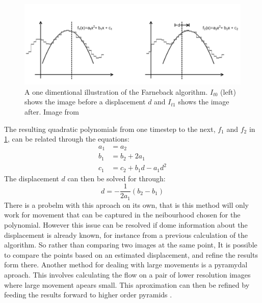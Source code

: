 \documentclass{UoNMCHA}
\numberwithin{equation}{section}
\begin{document}
\begin{figure}[ht]\label{fig:farnebackAlgorithm}
    \begin{center}
        \includegraphics[width=1\linewidth]{Figures/farnebackAccuracy}
        \caption{A one dimentional illustration of the Farneback algorithm. $I_{t0}$ (left) shows the image before a displacement $d$ and $I_{t1}$ shows the image after. Image from \citep{learningOpenCV}}
    \end{center}
\end{figure}
The resulting quadratic polynomials from one timestep to the next, $f_{1}$ and $f_{2}$ in \cref{fig:farnebackAlgorithm}, can be related through the equations:
\begin{equation}
	\begin{split}
		a_{1} &= a_{2}\\
		b_{1} &= b_{2} + 2a_{1}\\
		c_{1} &= c_{2} + b_{1}d-a_{1}d^{2}
	\end{split}
\end{equation}
The displacement $d$ can then be solved for through:
\begin{equation}
	d = -\frac{1}{2a_{1}}(b_{2}-b_{1})
\end{equation}
There is a probelm with this aproach on its own, that is this method will only work for movement that can be captured in the neibourhood chosen for the polynomial. However this issue can be resolved if dome information about the displacement is already known, for instance from a previous calculation of the algorithm. So rather than comparing two images at the same point, It is possible to compare the points based on an estimated displacement, and refine the results form there. Another method for dealing with large movements is a pyramydal aproach. This involves calculating the flow on a pair of lower resolution images where large movement apears small. This aproximation can then be refined by feeding the results forward to higher order pyramids \citep{learningOpenCV}.
\end{document}
